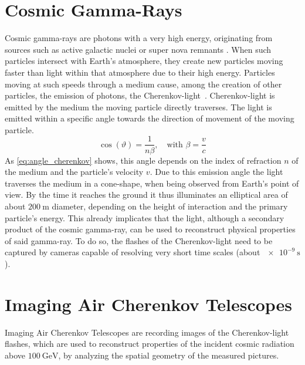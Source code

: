 \section{Cosmic Gamma-Rays}
%
Cosmic gamma-rays are photons with a very high energy, originating from sources such as active galactic nuclei or super nova remnants \cite{FACT-Design}. When such particles intersect
with Earth's atmosphere, they create new particles moving faster than light
within that atmosphere due to their high energy. Particles moving at such
speeds through a medium cause, among the creation of other particles, the
emission of photons, the Cherenkov-light~\cite{Cherenkov}.
Cherenkov-light is emitted by the medium the moving particle directly traverses.
The light is emitted within a specific angle towards the direction of movement of the moving particle.
%
\begin{equation}
    \cos(\vartheta) = \frac{1}{n\beta}, \quad \text{with } \beta=\frac{v}{c}
    \label{eq:angle_cherenkov}
\end{equation}
%
As \autoref{eq:angle_cherenkov} shows, this angle depends on the index of
refraction $n$ of the medium and the particle's velocity $v$. Due to this emission
angle the light traverses the medium in a cone-shape, when being observed from
Earth's point of view. By the time it reaches the ground it thus
illuminates an elliptical area of about $\SI{200}{\meter}$ diameter, depending
on the height of interaction and the primary particle's energy.
This already implicates that the light, although a secondary product of the
cosmic gamma-ray, can be used to reconstruct physical properties of
said gamma-ray. To do so, the flashes of the Cherenkov-light need to
be captured by cameras capable of resolving very short time scales (about
$\SI{e-9}{\second}$).

\section{Imaging Air Cherenkov Telescopes}

Imaging Air Cherenkov Telescopes are recording images of the Cherenkov-light flashes, which are used to
reconstruct properties of the incident cosmic radiation above
$\SI{100}{\giga\electronvolt}$, by analyzing the spatial geometry of the
measured pictures.

